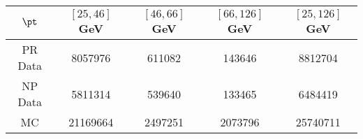 \begin{tabular}{c||c|c|c||c}
 $\pt$ & $[25, 46]$ GeV & $[46, 66]$ GeV & $[66, 126]$ GeV & $[25, 126]$ GeV \\
\hline
PR Data & 8057976 & 611082 & 143646 & 8812704 \\
NP Data & 5811314 & 539640 & 133465 & 6484419 \\
MC & 21169664 & 2497251 & 2073796 & 25740711 \\
\end{tabular}
